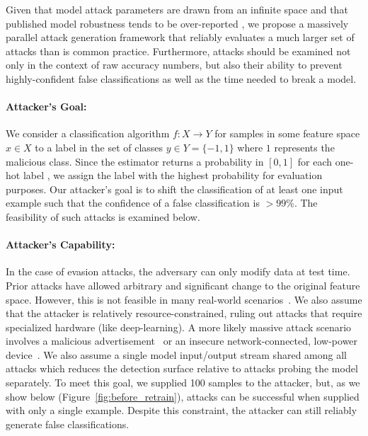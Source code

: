 \documentclass[fonts]{icst}
\begin{document}
Given that model attack parameters are drawn from an infinite space and that published model robustness tends to be over-reported \cite{croce2020reliable}, we propose a massively parallel attack generation framework that reliably evaluates a much larger set of attacks than is common practice. Furthermore, attacks should be examined not only in the context of raw accuracy numbers, but also their ability to prevent highly-confident false classifications as well as the time needed to break a model. 


\paragraph{Attacker's Goal: }


We consider a classification algorithm $f: X \rightarrow Y $ for samples in some feature space $x \in X$ to a label in the set of classes $y \in Y = \{ -1, 1\}$ where $1$ represents the malicious class. Since the estimator returns a probability in $[0,1]$ for each one-hot label \cite{scikit-learn}, we assign the label with the highest probability for evaluation purposes. Our attacker's goal is to shift the classification of at least one input example such that the confidence of a false classification is $>99\%$. The feasibility of such attacks is examined below.


\paragraph{Attacker's Capability: }


In the case of evasion attacks, the adversary can only modify data at test time. Prior attacks have allowed arbitrary and significant change to the original feature space. However, this is not feasible in many real-world scenarios~\cite{biggio2013evasion}. We also assume that the attacker is relatively resource-constrained, ruling out attacks that require specialized hardware (like deep-learning). A more likely massive attack scenario involves a malicious advertisement~\cite{liu_2020} or an insecure network-connected, low-power device~\cite{meidan_2018}. We also assume a single model input/output stream shared among all attacks which reduces the detection surface relative to attacks probing the model separately. To meet this goal, we supplied 100 samples to the attacker, but, as we show below (Figure~\ref{fig:before_retrain}), attacks can be successful when supplied with only a single example. Despite this constraint, the attacker can still reliably generate false classifications.
\end{document}
